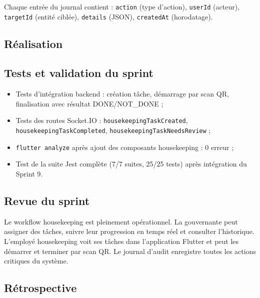 Chaque entrée du journal contient : \texttt{action} (type d'action), \texttt{userId} (acteur), \texttt{targetId} (entité ciblée), \texttt{details} (JSON), \texttt{createdAt} (horodatage).

\subsection{Réalisation}


\subsection{Tests et validation du sprint}

\begin{itemize}
  \item Tests d'intégration backend : création tâche, démarrage par scan QR, finalisation avec résultat DONE/NOT\_DONE ;
  \item Tests des routes Socket.IO : \texttt{housekeepingTaskCreated}, \texttt{housekeepingTaskCompleted}, \texttt{housekeepingTaskNeedsReview} ;
  \item \texttt{flutter analyze} après ajout des composants housekeeping : 0 erreur ;
  \item Test de la suite Jest complète (7/7 suites, 25/25 tests) après intégration du Sprint 9.
\end{itemize}

\subsection{Revue du sprint}

Le workflow housekeeping est pleinement opérationnel. La gouvernante peut assigner des tâches, suivre leur progression en temps réel et consulter l'historique. L'employé housekeeping voit ses tâches dans l'application Flutter et peut les démarrer et terminer par scan QR. Le journal d'audit enregistre toutes les actions critiques du système.

\subsection{Rétrospective}


